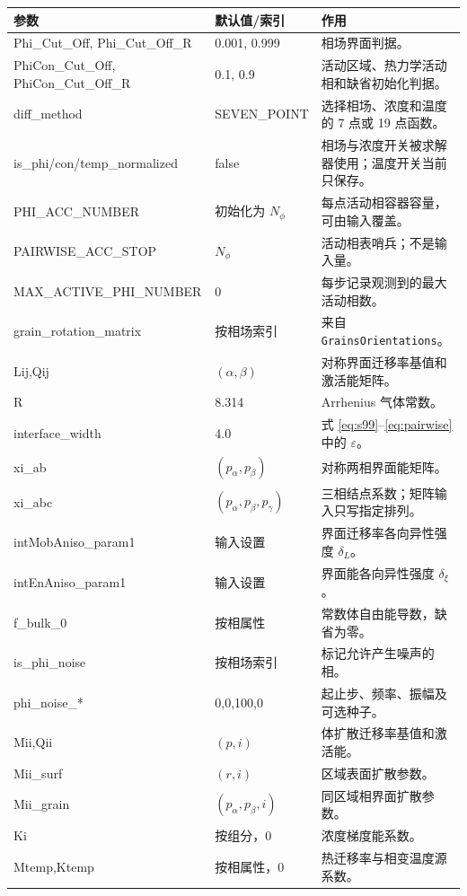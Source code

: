 \documentclass[UTF8,a4paper,11pt]{ctexart}
\newcommand{\code}[1]{\texttt{#1}}
\begin{document}
\begin{longtable}{>{\ttfamily}p{}p{}p{}}
\toprule
\normalfont 参数 & 默认值/索引 & 作用\\
\midrule
\endhead
Phi\_Cut\_Off, Phi\_Cut\_Off\_R & 0.001, 0.999 & 相场界面判据。\\
PhiCon\_Cut\_Off, PhiCon\_Cut\_Off\_R & 0.1, 0.9 & 活动区域、热力学活动相和缺省初始化判据。\\
diff\_method & SEVEN\_POINT & 选择相场、浓度和温度的 7 点或 19 点函数。\\
is\_phi/con/temp\_normalized & false & 相场与浓度开关被求解器使用；温度开关当前只保存。\\
PHI\_ACC\_NUMBER & 初始化为 $N_\phi$ & 每点活动相容器容量，可由输入覆盖。\\
PAIRWISE\_ACC\_STOP & $N_\phi$ & 活动相表哨兵；不是输入量。\\
MAX\_ACTIVE\_PHI\_NUMBER & 0 & 每步记录观测到的最大活动相数。\\
grain\_rotation\_matrix & 按相场索引 & 来自 \code{GrainsOrientations}。\\
Lij,Qij & $(\alpha,\beta)$ & 对称界面迁移率基值和激活能矩阵。\\
R & 8.314 & Arrhenius 气体常数。\\
interface\_width & 4.0 & 式 \eqref{eq:s99}--\eqref{eq:pairwise} 中的 $\varepsilon$。\\
xi\_ab & $(p_\alpha,p_\beta)$ & 对称两相界面能矩阵。\\
xi\_abc & $(p_\alpha,p_\beta,p_\gamma)$ & 三相结点系数；矩阵输入只写指定排列。\\
intMobAniso\_param1 & 输入设置 & 界面迁移率各向异性强度 $\delta_L$。\\
intEnAniso\_param1 & 输入设置 & 界面能各向异性强度 $\delta_\xi$。\\
f\_bulk\_0 & 按相属性 & 常数体自由能导数，缺省为零。\\
is\_phi\_noise & 按相场索引 & 标记允许产生噪声的相。\\
phi\_noise\_* & 0,0,100,0 & 起止步、频率、振幅及可选种子。\\
Mii,Qii & $(p,i)$ & 体扩散迁移率基值和激活能。\\
Mii\_surf & $(r,i)$ & 区域表面扩散参数。\\
Mii\_grain & $(p_\alpha,p_\beta,i)$ & 同区域相界面扩散参数。\\
Ki & 按组分，0 & 浓度梯度能系数。\\
Mtemp,Ktemp & 按相属性，0 & 热迁移率与相变温度源系数。\\

\end{longtable}
\end{document}
